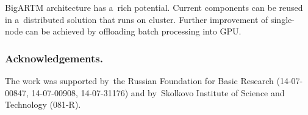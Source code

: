 \documentclass{acm_proc_article-sp}
\begin{document}
\mbox{BigARTM} architecture has a~rich potential.
Current components can be reused in a~distributed solution that runs on cluster.
Further improvement of single-node can be achieved by offloading batch processing into GPU.


\bigskip
\subsubsection*{Acknowledgements.}
\nopagebreak
The work was supported by~the Russian Foundation for Basic Research (14-07-00847, 14-07-00908, 14-07-31176)
and by~Skolkovo Institute of Science and Technology (081-R).


%
%
\end{document}
